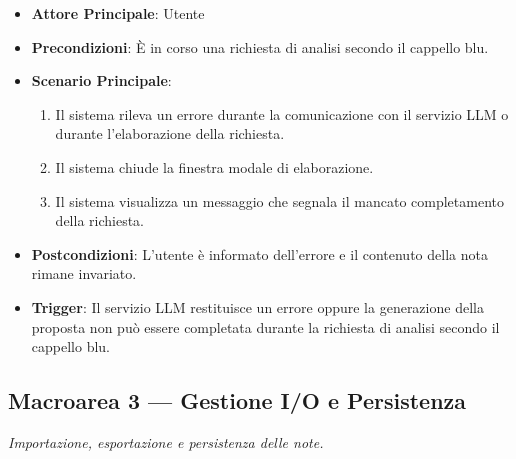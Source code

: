 \begin{itemize}
    \item \textbf{Attore Principale}: Utente
    \item \textbf{Precondizioni}: È in corso una richiesta di analisi secondo il cappello blu.
    \item \textbf{Scenario Principale}:
    \begin{enumerate}
        \item Il sistema rileva un errore durante la comunicazione con il servizio LLM o durante l'elaborazione della richiesta.
        \item Il sistema chiude la finestra modale di elaborazione.
        \item Il sistema visualizza un messaggio che segnala il mancato completamento della richiesta.
    \end{enumerate}
    \item \textbf{Postcondizioni}: L'utente è informato dell'errore e il contenuto della nota rimane invariato.
    \item \textbf{Trigger}: Il servizio LLM restituisce un errore oppure la generazione della proposta non può essere completata durante la richiesta di analisi secondo il cappello blu.
\end{itemize}

\newpage
\subsection{Macroarea 3 — Gestione I/O e Persistenza}
\textit{Importazione, esportazione e persistenza delle note.}

\vspace{0.3cm}
\noindent
{}
\vspace{0.3cm}

